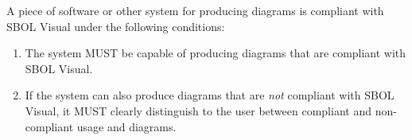 A piece of software or other system for producing diagrams is
compliant with SBOL Visual under the following conditions:
\begin{enumerate}
\item The system MUST be capable of producing diagrams that are
  compliant with SBOL Visual.
\item If the system can also produce diagrams that are {\em not}
  compliant with SBOL Visual, it MUST clearly distinguish to the user
  between compliant and non-compliant usage and diagrams.
\end{enumerate}

